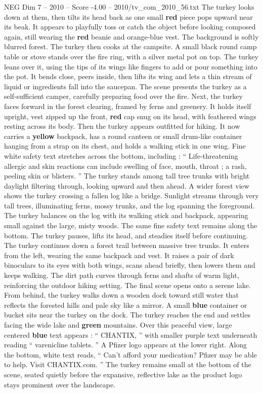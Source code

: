 \begin{textsample}{NEG Dim 7 – 2010 – Score -4.00 – 2010/tv\_com\_2010\_56.txt}
The turkey looks down at them, then tilts its head back as one small \textbf{red} piece pops upward near its beak.
It appears to playfully toss or catch the object before looking composed again, still wearing the \textbf{red} beanie and orange-blue vest.
The background is softly blurred forest.
The turkey then cooks at the campsite.
A small black round camp table or stove stands over the fire ring, with a silver metal pot on top.
The turkey leans over it, using the tips of its wings like fingers to add or pour something into the pot.
It bends close, peers inside, then lifts its wing and lets a thin stream of liquid or ingredients fall into the saucepan.
The scene presents the turkey as a self-sufficient camper, carefully preparing food over the fire.
Next, the turkey faces forward in the forest clearing, framed by ferns and greenery.
It holds itself upright, vest zipped up the front, \textbf{red} cap snug on its head, with feathered wings resting across its body.
Then the turkey appears outfitted for hiking.
It now carries a \textbf{yellow} backpack, has a round canteen or small drum-like container hanging from a strap on its chest, and holds a walking stick in one wing.
Fine white safety text stretches across the bottom, including : “ Life-threatening allergic and skin reactions can include swelling of face, mouth, throat ; a rash, peeling skin or blisters. ” The turkey stands among tall tree trunks with bright daylight filtering through, looking upward and then ahead.
A wider forest view shows the turkey crossing a fallen log like a bridge.
Sunlight streams through very tall trees, illuminating ferns, mossy trunks, and the log spanning the foreground.
The turkey balances on the log with its walking stick and backpack, appearing small against the large, misty woods.
The same fine safety text remains along the bottom.
The turkey pauses, lifts its head, and steadies itself before continuing.
The turkey continues down a forest trail between massive tree trunks.
It enters from the left, wearing the same backpack and vest.
It raises a pair of dark binoculars to its eyes with both wings, scans ahead briefly, then lowers them and keeps walking.
The dirt path curves through ferns and shafts of warm light, reinforcing the outdoor hiking setting.
The final scene opens onto a serene lake.
From behind, the turkey walks down a wooden dock toward still water that reflects the forested hills and pale sky like a mirror.
A small \textbf{blue} container or bucket sits near the turkey on the dock.
The turkey reaches the end and settles facing the wide lake and \textbf{green} mountains.
Over this peaceful view, large centered \textbf{blue} text appears : “ CHANTIX, ” with smaller purple text underneath reading “ varenicline tablets. ” A Pfizer logo appears at the lower right.
Along the bottom, white text reads, “ Can't afford your medication?
Pfizer may be able to help.
Visit CHANTIX.com. ” The turkey remains small at the bottom of the scene, seated quietly before the expansive, reflective lake as the product logo stays prominent over the landscape.

\end{textsample}
